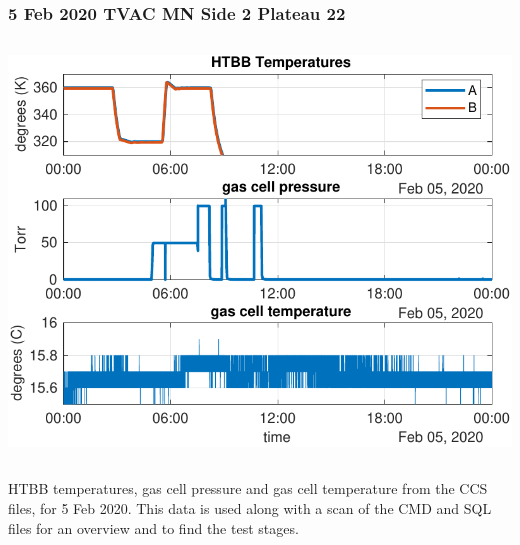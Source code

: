 \documentclass[9pt]{beamer}
\begin{document}
\begin{frame}
\frametitle{5 Feb 2020 TVAC MN Side 2 Plateau 22}
\begin{columns}[t]
\begin{column}{0.6\textwidth}
  \begin{centering}
  \includegraphics[width=\textwidth]{harvest_02-05/css_summary_02_05.pdf}
  \end{centering}\vspace{3mm}


\end{column}
\end{columns}

HTBB temperatures, gas cell pressure and gas cell temperature from
the CCS files, for 5 Feb 2020.  This data is used along with a scan
of the CMD and SQL files for an overview and to find the test stages.

\end{frame}
\end{document}
